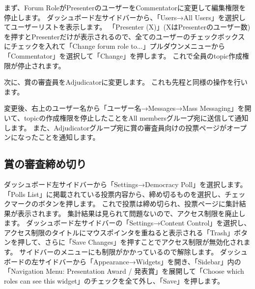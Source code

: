 \documentclass[titlepage,10pt,a4paper,uplatex]{jsbook}
\begin{document}
まず、Forum RoleがPresenterのユーザーをCommentatorに変更して編集権限を停止します。
ダッシュボード左サイドバーから、「Users→All Users」を選択してユーザーリストを表示します。
「Presenter (X)」(XはPresenterのユーザー数)を押すとPresenterだけが表示されるので、全てのユーザーのチェックボックスにチェックを入れて「Change forum role to...」プルダウンメニューから「Commentator」を選択して「Change」を押します。
これで全員のtopic作成権限が停止されます。

次に、賞の審査員をAdjudicatorに変更します。
これも先程と同様の操作を行います。

変更後、右上のユーザー名から「ユーザー名→Messages→Mass Messaging」を開いて、topicの作成権限を停止したことをAll membersグループ宛に送信して通知します。
また、Adjudicatorグループ宛に賞の審査員向けの投票ページがオープンになったことを通知します。

\subsection{賞の審査締め切り}

ダッシュボード左サイドバーから「Settings→Democracy Poll」を選択します。
「Polls List」に掲載されている投票内容から、締め切るものを選択し、チェックマークのボタンを押します。
これで投票は締め切られ、投票ページに集計結果が表示されます。
集計結果は見られて問題ないので、アクセス制限を廃止します。
ダッシュボード左サイドバーの「Settings→Content Control」を選択し、アクセス制限のタイトルにマウスポインタを重ねると表示される「Trash」ボタンを押して、さらに「Save Changes」を押すことでアクセス制限が無効化されます。
サイドバーのメニューにも制限がかかっているので解除します。
ダッシュボードの左サイドバーから「Appearance→Widgets」を開き、「Sidebar」内の「Navigation Menu: Presentation Award / 発表賞」を展開して「Choose which roles can see this widget」のチェックを全て外し、「Save」を押します。
\end{document}

